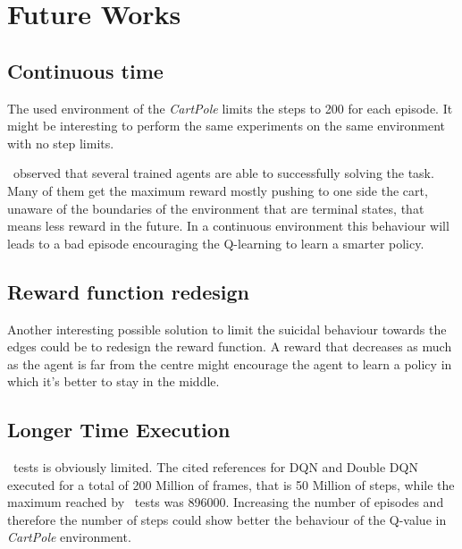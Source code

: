 
\section{Future Works}

\subsection{Continuous time}

The used environment of the \textit{CartPole} limits the steps to 200 for each episode. It might be interesting to perform the same experiments on the same environment with no step limits.

\Auth~observed that several trained agents are able to successfully solving the task. Many of them get the maximum reward mostly pushing to one side the cart, unaware of the boundaries of the environment that are terminal states, that means less reward in the future. In a continuous environment this behaviour will leads to a bad episode encouraging the Q-learning to learn a smarter policy.

\subsection{Reward function redesign}

Another interesting possible solution to limit the suicidal behaviour towards the edges could be to redesign the reward function. A reward that decreases as much as the agent is far from the centre might encourage the agent to learn a policy in which it's better to stay in the middle.

\subsection{Longer Time Execution}

\Authpp~tests is obviously limited. The cited references for DQN and Double DQN executed for a total of 200 Million of frames, that is 50 Million of steps, while the maximum reached by \authpp~tests was 896000. Increasing the number of episodes and therefore the number of steps could show better the behaviour of the Q-value in \textit{CartPole} environment.